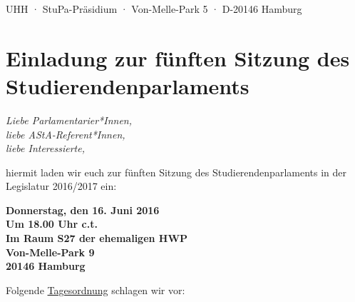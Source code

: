 \documentclass[ngerman,headheight=70pt]{scrartcl}
\begin{document}
    UHH · StuPa-Präsidium · Von-Melle-Park 5 · D-20146 Hamburg

    \section*{Einladung zur fünften Sitzung des Studierendenparlaments}

    \textit{Liebe Parlamentarier*Innen,\\
    liebe AStA-Referent*Innen,\\
    liebe Interessierte,}

    hiermit laden wir euch zur fünften Sitzung des Studierendenparlaments
    in der Legislatur 2016/2017 ein:

    \textbf{Donnerstag, den 16. Juni 2016\\
    Um 18.00 Uhr c.t.\\
    Im Raum S27 der ehemaligen HWP\\
    Von-Melle-Park 9\\
    20146 Hamburg}

    Folgende \underline{Tagesordnung} schlagen wir vor:
\end{document}
